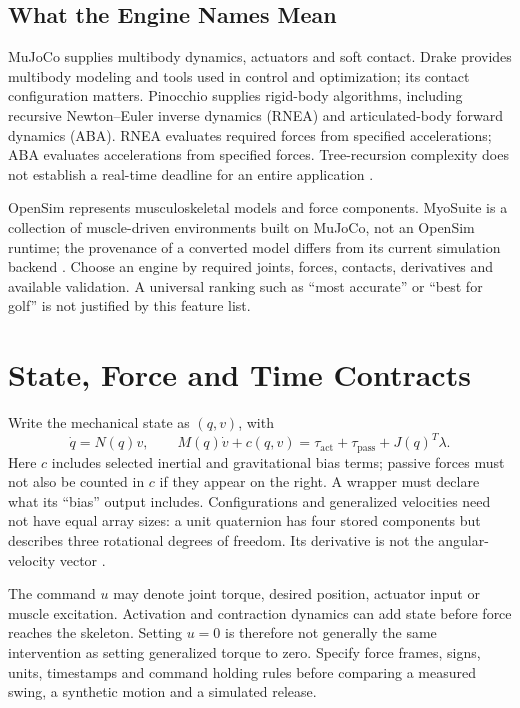 \subsection{What the Engine Names Mean}

MuJoCo supplies multibody dynamics, actuators and soft contact. Drake provides
multibody modeling and tools used in control and optimization; its contact
configuration matters. Pinocchio supplies rigid-body algorithms, including
recursive Newton--Euler inverse dynamics (RNEA) and articulated-body forward
dynamics (ABA). RNEA evaluates required forces from specified accelerations;
ABA evaluates accelerations from specified forces. Tree-recursion complexity
does not establish a real-time deadline for an entire application
\cite{MuJoCoComputationReview,PinocchioAlgorithmsReview,DrakeHydroelasticReview}.

OpenSim represents musculoskeletal models and force components. MyoSuite is a
collection of muscle-driven environments built on MuJoCo, not an OpenSim runtime;
the provenance of a converted model differs from its current simulation backend
\cite{OpenSimHuntCrossleyReview,MyoSuitePlatformReview}. Choose an engine by
required joints, forces, contacts, derivatives and available validation.
A universal ranking such as ``most accurate'' or ``best for golf'' is not
justified by this feature list.

\section{State, Force and Time Contracts}

Write the mechanical state as $(q,v)$, with
\begin{equation}
 \dot q=N(q)v,\qquad M(q)\dot v+c(q,v)
 =\tau_{\mathrm{act}}+\tau_{\mathrm{pass}}+J(q)^T\lambda.
\end{equation}
Here $c$ includes selected inertial and gravitational bias terms; passive forces
must not also be counted in $c$ if they appear on the right. A wrapper must
declare what its ``bias'' output includes. Configurations and generalized
velocities need not have equal array sizes: a unit quaternion has four stored
components but describes three rotational degrees of freedom. Its derivative
is not the angular-velocity vector \cite{MuJoCoComputationReview}.

The command $u$ may denote joint torque, desired position, actuator input or
muscle excitation. Activation and contraction dynamics can add state before
force reaches the skeleton. Setting $u=0$ is therefore not generally the same
intervention as setting generalized torque to zero. Specify force frames, signs,
units, timestamps and command holding rules before comparing a measured swing,
a synthetic motion and a simulated release.

